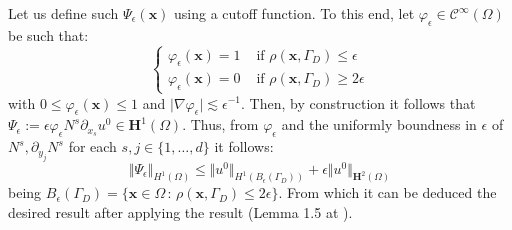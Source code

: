 Let us define such $\Psi_{\epsilon}(\mathbf{x})$ using a cutoff function. To this end, let $\varphi_{\epsilon} \in \mathcal{C}^{\infty}(\Omega)$ be such that:
\begin{equation*}
    \left \{
    \begin{aligned}
    \varphi_{\epsilon}(\mathbf{x}) = 1 & \text{ if } \rho(\mathbf{x}, \Gamma_D) \leq \epsilon \\
    \varphi_{\epsilon}(\mathbf{x}) = 0 & \text{ if } \rho(\mathbf{x}, \Gamma_D) \geq 2\epsilon 
    \end{aligned}
    \right.
\end{equation*}
with $0 \leq \varphi_{\epsilon}(\mathbf{x}) \leq 1$ and $\vert \nabla \varphi_{\epsilon} \vert \lesssim \epsilon^{-1}$.
Then, by construction it follows that $\Psi_{\epsilon} := \epsilon \varphi_{\epsilon} N^s \partial_{x_s}u^0 \in \mathbf{H}^1(\Omega)$.
Thus, from $\varphi_{\epsilon}$ and the uniformly boundness in $\epsilon$ of $N^s, \partial_{y_j} N^s$ for each $s,j \in \{1,\dots, d\}$ it follows:
\begin{equation*}
    \Vert \Psi_{\epsilon} \Vert_{H^1(\Omega)} \leq \Vert u^0 \Vert_{H^1(B_{\epsilon}(\Gamma_D))} + \epsilon \Vert u^0 \Vert_{\mathbf{H}^2(\Omega)}
\end{equation*}
being $B_{\epsilon}(\Gamma_D) = \{\mathbf{x}\in \Omega \, :\, \rho(\mathbf{x},\Gamma_D) \leq 2\epsilon \}$. From which it can be deduced the desired result after applying the  result (Lemma 1.5 at \cite{oleinik1992mathematical}). %

